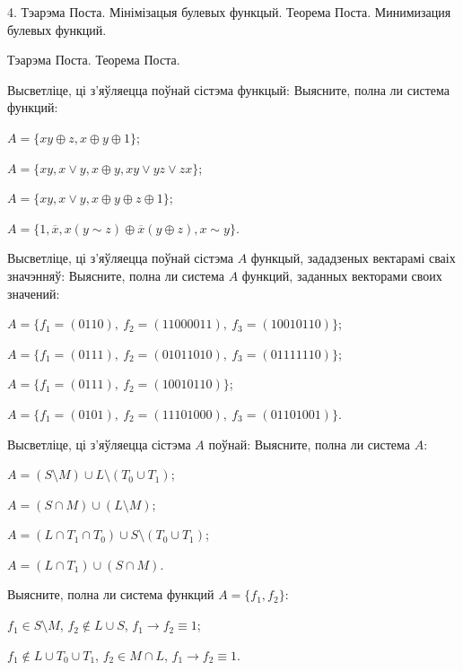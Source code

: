 \documentclass[12pt, a4paper]{article}
\begin{document}
\biLangHeader
{4. Тэарэма Поста. Мінімізацыя булевых функцый.}
{Теорема Поста. Минимизация булевых функций.}

\biLangHeader
{Тэарэма Поста.}
{Теорема Поста.}

\begin{problemList}
    
\problemItemWithCommonPart
{Высветліце, ці з'яўляецца поўнай сістэма функцый:}
{Выясните, полна ли система функций:}
{%
\begin{belarusianEnumerateTwocol}
    \item $A=\{xy\oplus z, x\oplus y\oplus 1\}$;
    \item $A=\{xy, x\vee y, x\oplus y, xy\vee yz\vee zx\}$;
    \item $A=\{xy, x\vee y, x\oplus y\oplus z\oplus 1\}$;
    \item $A=\{1, \overline {x}, x(y\sim z)\oplus\overline{x}(y\oplus z), x\sim y\}$.
\end{belarusianEnumerateTwocol}
}

\smallskip

\problemItemWithCommonPart
{Высветліце, ці з'яўляецца поўнай сістэма $A$ функцый, зададзеных вектарамі сваіх значэнняў:}
{Выясните, полна ли система $A$ функций, заданных векторами своих значений:}
{%
\begin{belarusianEnumerate}
    \item $A=\{f_1=(0110),\ f_2=(11000011),\ f_3=(10010110)\}$;
    \item $A=\{f_1=(0111),\ f_2=(01011010),\ f_3=(01111110)\}$;
    \item $A=\{f_1=(0111),\ f_2=(10010110)\}$;
    \item $A=\{f_1=(0101),\ f_2=(11101000),\ f_3=(01101001)\}$.
\end{belarusianEnumerate}
}

\smallskip

\problemItemWithCommonPart
{Высветліце, ці з'яўляецца сістэма $A$ поўнай:}
{Выясните, полна ли система $A$:}
{%
\begin{belarusianEnumerateTwocol}
    \item $A=(S\setminus M)\cup L\setminus(T_0\cup T_1)$;
    \item $A=(S\cap M)\cup(L\setminus M)$;
    \item $A=(L\cap T_1\cap T_0)\cup S\setminus(T_0\cup T_1)$;
    \item $A=(L\cap T_1)\cup(S\cap M)$.
\end{belarusianEnumerateTwocol}
}

\smallskip

{Выясните, полна ли система функций $A=\{f_1, f_2\}$:}
{%
\begin{belarusianEnumerate}
    \item $f_1\in S\setminus M$, $f_2\not\in L\cup S$, $f_1 \rightarrow f_2 \equiv 1$;
    \item $f_1\not\in L \cup T_0 \cup T_1$, $f_2\in M\cap L$, $f_1 \rightarrow f_2 \equiv 1$.
\end{belarusianEnumerate}
}

\end{problemList}
\end{document}
